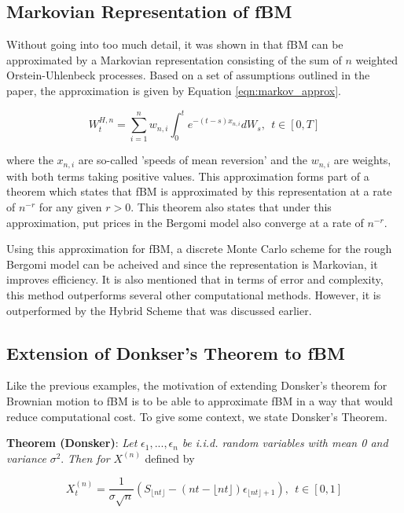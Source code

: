 \documentclass[12pt,oneside]{article}
\begin{document}
\subsection{Markovian Representation of fBM}
\label{subsec:markovian_rep_fBm}
Without going into too much detail, it was shown in \cite{harms2020strong} that fBM can be approximated by a Markovian representation consisting of the sum of $n$ weighted Orstein-Uhlenbeck processes.  Based on a set of assumptions outlined in the paper, the approximation is given by Equation \ref{eqn:markov_approx}.

\begin{equation}
\label{eqn:markov_approx}
W_t^{H,n} = \sum_{i=1}^n w_{n,i} \int_0^t e^{-(t-s)x_{n,i}}dW_s, \ \ t \in [0,T] 
\end{equation}

where the $x_{n,i}$ are so-called 'speeds of mean reversion' and the $w_{n,i}$ are weights, with both terms taking positive values. This approximation forms part of a theorem which states that fBM is approximated by this representation at a rate of $n^{-r}$ for any given $r>0$.  This theorem also states that under this approximation, put prices in the Bergomi model also converge at a rate of $n^{-r}$. 

Using this approximation for fBM, a discrete Monte Carlo scheme for the rough Bergomi model can be acheived and since the representation is Markovian, it improves efficiency. It is also mentioned that in terms of error and complexity,  this method outperforms several other computational methods. However, it is outperformed by the Hybrid Scheme that was discussed earlier. 

\subsection{Extension of Donkser's Theorem to fBM}
Like the previous examples, the motivation of extending Donsker's theorem for Brownian motion to fBM is to be able to approximate fBM in a way that would reduce computational cost. To give some context,  we state Donsker's Theorem.

 \textbf{Theorem (Donsker)}: \emph{Let} $\epsilon_1,...,\epsilon_n$ \emph{be i.i.d. random variables with mean 0 and variance} $\sigma^2$. \emph{Then for} $X^{(n)}$ defined by
 
 \begin{equation}
 \label{eq:donsker_thm}
 X_t^{(n)} = \frac{1}{\sigma \sqrt{n}} (S_{\lfloor nt \rfloor} - (nt - \lfloor nt \rfloor) \epsilon_{\lfloor nt \rfloor + 1}), \ \ t\in[0,1]
 \end{equation}
 
\end{document}

